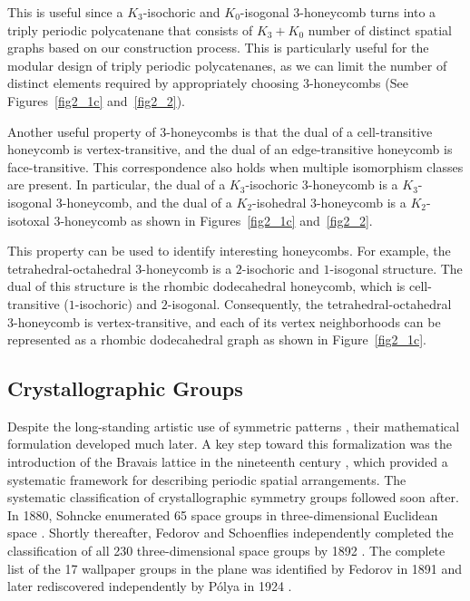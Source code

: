 \documentclass[times,twocolumn,final]{elsarticle}
\begin{document}
This is useful since a $K_3$-isochoric and $K_0$-isogonal 3-honeycomb turns into a triply periodic polycatenane that consists of $K_3+K_0$ number of distinct spatial graphs based on our construction process. This is particularly useful for the modular design of triply periodic polycatenanes, as we can limit the number of distinct elements required by appropriately choosing 3-honeycombs (See Figures~\ref{fig2_1c} and~\ref{fig2_2}). 

Another useful property of 3-honeycombs is that the dual of a cell-transitive honeycomb is vertex-transitive, and the dual of an edge-transitive honeycomb is face-transitive. This correspondence also holds when multiple isomorphism classes are present. In particular, the dual of a $K_3$-isochoric 3-honeycomb is a $K_3$-isogonal 3-honeycomb, and the dual of a $K_2$-isohedral 3-honeycomb is a $K_2$-isotoxal 3-honeycomb as shown in Figures~\ref{fig2_1c} and~\ref{fig2_2}.

This property can be used to identify interesting honeycombs. For example, the tetrahedral-octahedral 3-honeycomb is a $2$-isochoric and $1$-isogonal structure. The dual of this structure is the rhombic dodecahedral honeycomb, which is cell-transitive ($1$-isochoric) and $2$-isogonal. Consequently, the tetrahedral-octahedral 3-honeycomb is vertex-transitive, and each of its vertex neighborhoods can be represented as a rhombic dodecahedral graph as shown in Figure~\ref{fig2_1c}. 

\subsection{Crystallographic Groups}\label{sec:CGs}

Despite the long-standing artistic use of symmetric patterns \cite{montesinos2012classical, grunbaum2006symmetry, bodner2013planar}, their mathematical formulation developed much later. A key step toward this formalization was the introduction of the Bravais lattice in the nineteenth century \cite{bravais1850systemes,mois2006historical}, which provided a systematic framework for describing periodic spatial arrangements. The systematic classification of crystallographic symmetry groups followed soon after. In 1880, Sohncke enumerated 65 space groups in three-dimensional Euclidean space \cite{sohncke1879entwickelung}. Shortly thereafter, Fedorov and Schoenflies independently completed the classification of all 230 three-dimensional space groups by 1892 \cite{vonfedorow1892, schoenflies1892, paufler2020fedorov,senechal1984introduction}. The complete list of the 17 wallpaper groups in the plane was identified by Fedorov in 1891 and later rediscovered independently by Pólya in 1924 \cite{fedorov1891symmetry,polya1924on}. 
\end{document}

